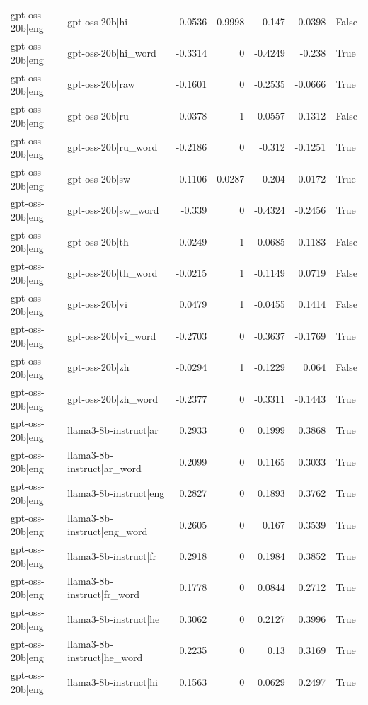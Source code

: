 \begin{table}
\begin{tabular}{l l r r r r l}
gpt-oss-20b|eng & gpt-oss-20b|hi & -0.0536 & 0.9998 & -0.147 & 0.0398 & False \\
gpt-oss-20b|eng & gpt-oss-20b|hi_word & -0.3314 & 0 & -0.4249 & -0.238 & True \\
gpt-oss-20b|eng & gpt-oss-20b|raw & -0.1601 & 0 & -0.2535 & -0.0666 & True \\
gpt-oss-20b|eng & gpt-oss-20b|ru & 0.0378 & 1 & -0.0557 & 0.1312 & False \\
gpt-oss-20b|eng & gpt-oss-20b|ru_word & -0.2186 & 0 & -0.312 & -0.1251 & True \\
gpt-oss-20b|eng & gpt-oss-20b|sw & -0.1106 & 0.0287 & -0.204 & -0.0172 & True \\
gpt-oss-20b|eng & gpt-oss-20b|sw_word & -0.339 & 0 & -0.4324 & -0.2456 & True \\
gpt-oss-20b|eng & gpt-oss-20b|th & 0.0249 & 1 & -0.0685 & 0.1183 & False \\
gpt-oss-20b|eng & gpt-oss-20b|th_word & -0.0215 & 1 & -0.1149 & 0.0719 & False \\
gpt-oss-20b|eng & gpt-oss-20b|vi & 0.0479 & 1 & -0.0455 & 0.1414 & False \\
gpt-oss-20b|eng & gpt-oss-20b|vi_word & -0.2703 & 0 & -0.3637 & -0.1769 & True \\
gpt-oss-20b|eng & gpt-oss-20b|zh & -0.0294 & 1 & -0.1229 & 0.064 & False \\
gpt-oss-20b|eng & gpt-oss-20b|zh_word & -0.2377 & 0 & -0.3311 & -0.1443 & True \\
gpt-oss-20b|eng & llama3-8b-instruct|ar & 0.2933 & 0 & 0.1999 & 0.3868 & True \\
gpt-oss-20b|eng & llama3-8b-instruct|ar_word & 0.2099 & 0 & 0.1165 & 0.3033 & True \\
gpt-oss-20b|eng & llama3-8b-instruct|eng & 0.2827 & 0 & 0.1893 & 0.3762 & True \\
gpt-oss-20b|eng & llama3-8b-instruct|eng_word & 0.2605 & 0 & 0.167 & 0.3539 & True \\
gpt-oss-20b|eng & llama3-8b-instruct|fr & 0.2918 & 0 & 0.1984 & 0.3852 & True \\
gpt-oss-20b|eng & llama3-8b-instruct|fr_word & 0.1778 & 0 & 0.0844 & 0.2712 & True \\
gpt-oss-20b|eng & llama3-8b-instruct|he & 0.3062 & 0 & 0.2127 & 0.3996 & True \\
gpt-oss-20b|eng & llama3-8b-instruct|he_word & 0.2235 & 0 & 0.13 & 0.3169 & True \\
gpt-oss-20b|eng & llama3-8b-instruct|hi & 0.1563 & 0 & 0.0629 & 0.2497 & True \\

\end{tabular}
\end{table}
